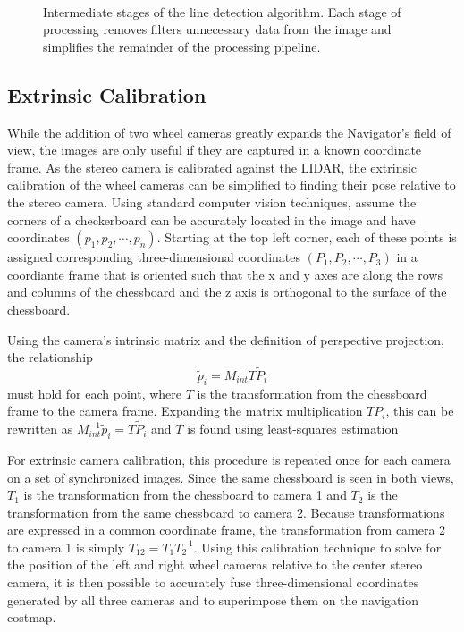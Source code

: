 \documentclass[twocolumn,11pt]{article}
\begin{document}
\begin{figure*}[t]
	\centering
	\\
	\caption{
		Intermediate stages of the line detection algorithm. Each stage of
		processing removes filters unnecessary data from the image and
		simplifies the remainder of the processing pipeline.
	}
	\label{fig:line-all}
\end{figure*}

\subsection{Extrinsic Calibration}
\label{sec:line-extrinsic}
While the addition of two wheel cameras greatly expands the Navigator's field
of view, the images are only useful if they are captured in a known coordinate
frame. As the stereo camera is calibrated against the LIDAR, the extrinsic
calibration of the wheel cameras can be simplified to finding their pose
relative to the stereo camera. Using standard computer vision techniques,
assume the corners of a checkerboard can be accurately located in the image and
have coordinates $(p_1, p_2, \cdots, p_n)$. Starting at the top left corner,
each of these points is assigned corresponding three-dimensional coordinates
$(P_1, P_2, \cdots, P_3)$ in a coordiante frame that is oriented such that the
x and y axes are along the rows and columns of the chessboard and the z axis is
orthogonal to the surface of the chessboard.

Using the camera's intrinsic matrix and the definition of perspective projection,
the relationship
\begin{equation*}
	\tilde{p}_i = M_{int} T \tilde{P}_i
\end{equation*}
must hold for each point, where $T$ is the transformation from the chessboard
frame to the camera frame. Expanding the matrix multiplication $T P_i$, this
can be rewritten as $M_{int}^{-1} \tilde{p}_i = T \tilde{P}_i$ and $T$ is found
using least-squares estimation

For extrinsic camera calibration, this procedure is repeated once for each camera
on a set of synchronized images. Since the same chessboard is seen in both views,
$T_1$ is the transformation from the chessboard to camera 1 and $T_2$ is the
transformation from the same chessboard to camera 2. Because transformations are
expressed in a common coordinate frame, the transformation from camera 2 to camera
1 is simply $T_{12} = T_1 T_2^{-1}$. Using this calibration technique to solve for
the position of the left and right wheel cameras relative to the center stereo camera,
it is then possible to accurately fuse three-dimensional coordinates generated by all
three cameras and to superimpose them on the navigation costmap.
\end{document}
